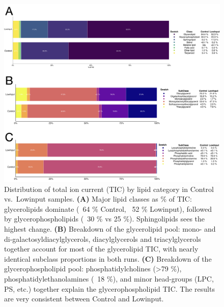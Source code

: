 \documentclass[10pt,letterpaper]{article}
\begin{document}
\begin{figure}[htp]
  \centering
  \includegraphics[width=\textwidth]{fig/supp/SuppFig5.png}
  \caption{
    Distribution of total ion current (TIC) by lipid category in Control vs.\ Lowinput samples. 
    {\bf(A)} Major lipid classes as \% of TIC: glycerolipids dominate (~64 \% Control, ~52 \% Lowinput), followed by glycerophospholipids (~30 \% vs 25 \%). Sphingolipids sees the highest change.
    {\bf(B)} Breakdown of the glycerolipid pool: mono- and di-galactosyldiacylglycerols, diacylglycerols and triacylglycerols together account for most of the glycerolipid TIC, with nearly identical subclass proportions in both runs. 
    {\bf(C)} Breakdown of the glycerophospholipid pool: phosphatidylcholines (>79 \%), phosphatidylethanolamines (~18 \%), and minor head-groups (LPC, PS, etc.) together explain the glycerophospholipid TIC. The results are very consistent between Control and Lowinput.
  }
  \label{fig:S5}
\end{figure}
\end{document}
